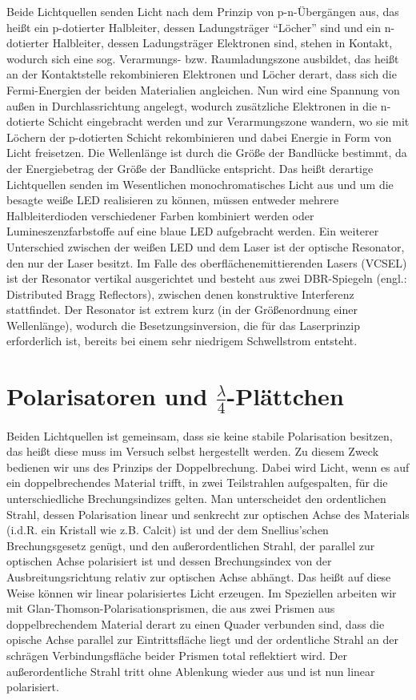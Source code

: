 \documentclass[bigchapter,colorback,accentcolor=tud4b,linedtoc,11pt]{tudreport}
\begin{document}
Beide Lichtquellen senden Licht nach dem Prinzip von p-n-Übergängen aus, das heißt ein p-dotierter Halbleiter, dessen Ladungsträger "`Löcher"' sind und ein n-dotierter Halbleiter, dessen Ladungsträger Elektronen sind, stehen in Kontakt, wodurch sich eine sog. Verarmungs- bzw. Raumladungszone ausbildet, das heißt an der Kontaktstelle rekombinieren Elektronen und Löcher derart, dass sich die Fermi-Energien der beiden Materialien angleichen. Nun wird eine Spannung von außen in Durchlassrichtung angelegt, wodurch zusätzliche Elektronen in die n-dotierte Schicht eingebracht werden und zur Verarmungszone wandern, wo sie mit Löchern der p-dotierten Schicht rekombinieren und dabei Energie in Form von Licht freisetzen. Die Wellenlänge ist durch die Größe der Bandlücke bestimmt, da der Energiebetrag der Größe der Bandlücke entspricht. Das heißt derartige Lichtquellen senden im Wesentlichen monochromatisches Licht aus und um die besagte weiße LED realisieren zu können, müssen entweder mehrere Halbleiterdioden verschiedener Farben kombiniert werden oder Lumineszenzfarbstoffe auf eine blaue LED aufgebracht werden. Ein weiterer Unterschied zwischen der weißen LED und dem Laser ist der optische Resonator, den nur der Laser besitzt. Im Falle des oberflächenemittierenden Lasers (VCSEL) ist der Resonator vertikal ausgerichtet und besteht aus zwei DBR-Spiegeln (engl.: Distributed Bragg Reflectors), zwischen denen konstruktive Interferenz stattfindet. Der Resonator ist extrem kurz (in der Größenordnung einer Wellenlänge), wodurch die Besetzungsinversion, die für das Laserprinzip erforderlich ist, bereits bei einem sehr niedrigem Schwellstrom entsteht.

\section{Polarisatoren und $\frac{\lambda}{4}$-Plättchen}
Beiden Lichtquellen ist gemeinsam, dass sie keine stabile Polarisation besitzen, das heißt diese muss im Versuch selbst hergestellt werden. Zu diesem Zweck bedienen wir uns des Prinzips der Doppelbrechung. Dabei wird Licht, wenn es auf ein doppelbrechendes Material trifft, in zwei Teilstrahlen aufgespalten, für die unterschiedliche Brechungsindizes gelten. Man unterscheidet den ordentlichen Strahl, dessen Polarisation linear und senkrecht zur optischen Achse des Materials (i.d.R. ein Kristall wie z.B. Calcit) ist und der dem Snellius'schen Brechungsgesetz genügt, und den außerordentlichen Strahl, der parallel zur optischen Achse polarisiert ist und dessen Brechungsindex von der Ausbreitungsrichtung relativ zur optischen Achse abhängt. Das heißt auf diese Weise können wir linear polarisiertes Licht erzeugen. Im Speziellen arbeiten wir mit Glan-Thomson-Polarisationsprismen, die aus zwei Prismen aus doppelbrechendem Material derart zu einen Quader verbunden sind, dass die opische Achse parallel zur Eintrittsfläche liegt und der ordentliche Strahl an der schrägen Verbindungsfläche beider Prismen total reflektiert wird. Der außerordentliche Strahl tritt ohne Ablenkung wieder aus und ist nun linear polarisiert.
\end{document}
